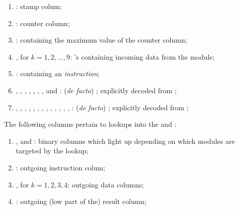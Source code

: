 \begin{enumerate}
	\item \oobStamp{}:
		stamp colum;
	\item \ct{}:
		counter column;
	\item \maxCt{}:
		\ccc{} containing the maximum value of the counter column;
	\item {}, for $k = 1, 2, \dots, 9$: \godGiven{}
		\ccc{}'s containing incoming data from the \hubMod{} module;
	\item \oobInstruction{}: \godGiven{}
		\ccc{} containing an \emph{\oobMod{} instruction};
	\item
		\oobInstIsJump{},
		\oobInstIsJumpI{},
		\oobInstIsRdc{},
		\oobInstIsCdl{},
		\oobInstIsXcall{},
		\oobInstIsCall{},
		\oobInstIsCreate{},
		\oobInstIsSstore{} and 
		\oobInstIsDeployment{}:
		(\emph{de facto}) \ccbc{}; explicitly decoded from \oobInst{};
	\item 
		\oobInstIsEcrecover{},
		\oobInstIsShaTwo{},
		\oobInstIsRipemd{},
		\oobInstIsIdentity{},
		\oobInstIsEcadd{},
		\oobInstIsEcmul{},
		\oobInstIsEcpairing{},
		\oobInstIsBlakeCds{},
		\oobInstIsBlakeParams{},
		\oobInstIsModexpCds{},
		\oobInstIsModexpXbs{},
		\oobInstIsModexpLead{},
		\oobInstIsModexpPricing{},
		\oobInstIsModexpExtract{}:
		(\emph{de facto}) \ccbc{}; explicitly decoded from \oobInstruction{};
\end{enumerate}
The following columns pertain to lookups into the \wcpMod{} and \addMod{}: 
\begin{enumerate}[resume]
	\item \wcpFlag{}, \addFlag{} and \modFlag{}:
		binary columns which light up depending on which modules are targeted by the lookup;
	\item \outgoingInst{}:
		outgoing instruction colum;
	\item {}, for $k = 1, 2, 3, 4$:
		outgoing data columns;
	\item \outgoingResLo{}:
		outgoing (low part of the) result column;
\end{enumerate}

